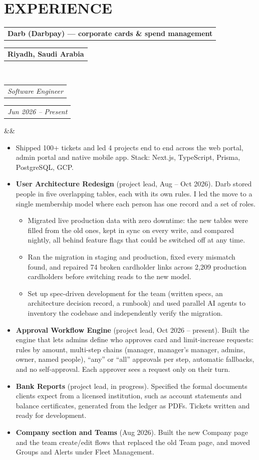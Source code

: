 \documentclass[11pt,a4paper,roman]{moderncv}
\makeatletter
\newcommand*{\customcventry}[7][.25em]{
  \begin{tabular}{@{}l} {\bfseries #4} \end{tabular}
  \hfill
  \begin{tabular}{l@{}} {\bfseries #5} \end{tabular} \\
  \begin{tabular}{@{}l} {\itshape #3} \end{tabular}
  \hfill
  \begin{tabular}{l@{}} {\itshape #2} \end{tabular}
  \ifx&#7&%
  \else{\\%
    \begin{minipage}{\maincolumnwidth}%
      \small#7%
    \end{minipage}}\fi%
  \par\addvspace{#1}}
\makeatother
\begin{document}
\section{EXPERIENCE}
{\customcventry{Jun 2026 -- Present}{Software Engineer}{Darb (Darbpay) — corporate cards \& spend management}{Riyadh, Saudi Arabia}{}{}}
{\small\begin{itemize}
\setlength\itemsep{0.15em}
\item Shipped 100+ tickets and led 4 projects end to end across the web portal, admin portal and native mobile app. Stack: Next.js, TypeScript, Prisma, PostgreSQL, GCP.
\item \textbf{User Architecture Redesign} (project lead, Aug -- Oct 2026). Darb stored people in five overlapping tables, each with its own rules. I led the move to a single membership model where each person has one record and a set of roles.
  \begin{itemize}
  \item Migrated live production data with zero downtime: the new tables were filled from the old ones, kept in sync on every write, and compared nightly, all behind feature flags that could be switched off at any time.
  \item Ran the migration in staging and production, fixed every mismatch found, and repaired 74 broken cardholder links across 2,209 production cardholders before switching reads to the new model.
  \item Set up spec-driven development for the team (written specs, an architecture decision record, a runbook) and used parallel AI agents to inventory the codebase and independently verify the migration.
  \end{itemize}
\item \textbf{Approval Workflow Engine} (project lead, Oct 2026 -- present). Built the engine that lets admins define who approves card and limit-increase requests: rules by amount, multi-step chains (manager, manager's manager, admins, owner, named people), ``any'' or ``all'' approvals per step, automatic fallbacks, and no self-approval. Each approver sees a request only on their turn.
\item \textbf{Bank Reports} (project lead, in progress). Specified the formal documents clients expect from a licensed institution, such as account statements and balance certificates, generated from the ledger as PDFs. Tickets written and ready for development.
\item \textbf{Company section and Teams} (Aug 2026). Built the new Company page and the team create/edit flows that replaced the old Team page, and moved Groups and Alerts under Fleet Management.

\end{itemize}}
\end{document}
